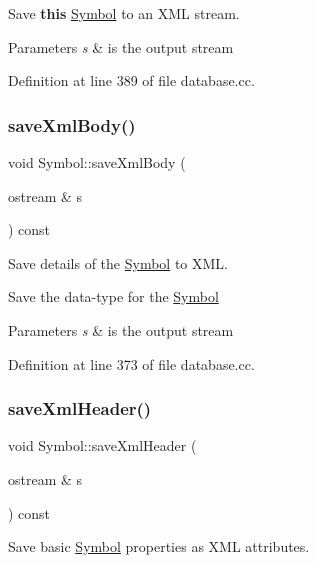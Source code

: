 Save {\bfseries{this}} \mbox{\hyperlink{class_symbol}{Symbol}} to an X\+ML stream. 


\begin{DoxyParams}{Parameters}
{\em s} & is the output stream \\
\hline
\end{DoxyParams}


Definition at line 389 of file database.\+cc.

\mbox{\label{class_symbol_aa3e9088abdd64c84b7905c29b944a72c}} 
\subsubsection{\texorpdfstring{saveXmlBody()}{saveXmlBody()}}
{\footnotesize\ttfamily void Symbol\+::save\+Xml\+Body (\begin{DoxyParamCaption}\item[{ostream \&}]{s }\end{DoxyParamCaption}) const}



Save details of the \mbox{\hyperlink{class_symbol}{Symbol}} to X\+ML. 

Save the data-\/type for the \mbox{\hyperlink{class_symbol}{Symbol}} 
\begin{DoxyParams}{Parameters}
{\em s} & is the output stream \\
\hline
\end{DoxyParams}


Definition at line 373 of file database.\+cc.

\mbox{\label{class_symbol_a3aad352e6eb26be6cff727b66e86a9d4}} 
\subsubsection{\texorpdfstring{saveXmlHeader()}{saveXmlHeader()}}
{\footnotesize\ttfamily void Symbol\+::save\+Xml\+Header (\begin{DoxyParamCaption}\item[{ostream \&}]{s }\end{DoxyParamCaption}) const}



Save basic \mbox{\hyperlink{class_symbol}{Symbol}} properties as X\+ML attributes. 


